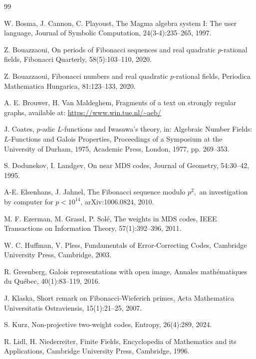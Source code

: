 \documentclass[12pt,reqno]{amsart}
\begin{document}
\begin{thebibliography}{99}


 W. Bosma, J. Cannon, C. Playoust, The Magma algebra system I: The user language, Journal of Symbolic Computation, 24(3-4):235--265, 1997.

 Z. Bouazzaoui, On periods of Fibonacci sequences and real quadratic $p$-rational fields, Fibonacci Quarterly, 58(5):103--110, 2020.

 Z. Bouazzaoui, Fibonacci numbers and real quadratic $p$-rational fields, Periodica Mathematica Hungarica, 81:123--133, 2020.

 A. E. Brouwer, H. Van Maldeghem, Fragments of a text on strongly regular graphs, available at: \url{https://www.win.tue.nl/\~aeb/}

 J. Coates, $p$-adic $L$-functions and Iwasawa's theory, in: Algebraic Number Fields: $L$-Functions and Galois Properties, Proceedings of a Symposium at the University of Durham, 1975, Academic Press, London, 1977, pp. 269--353.

 S. Dodunekov, I. Landgev, On near MDS codes, Journal of Geometry, 54:30--42, 1995.

 A-E. Elsenhans, J. Jahnel, The Fibonacci sequence modulo $p^2,$ an investigation by computer for $p < 10^{14}$, arXiv:1006.0824, 2010.

 M. F. Ezerman, M. Grassl, P. Sol\'e, The weights in MDS codes, IEEE Transactions on Information Theory, 57(1):392--396, 2011.

 W. C. Huffman, V. Pless, Fundamentals of Error-Correcting Codes, Cambridge University Press, Cambridge, 2003.

 R. Greenberg, Galois representations with open image, Annales math\'ematiques du Qu\'ebec, 40(1):83--119, 2016.

 J. Klaska, Short remark on Fibonacci-Wieferich primes, Acta Mathematica Universitatis Ostraviensis, 15(1):21--25, 2007.

 S. Kurz, Non-projective two-weight codes, Entropy, 26(4):289, 2024.

 R. Lidl, H. Niederreiter, Finite Fields, Encyclopedia of Mathematics and its Applications, Cambridge University Press, Cambridge, 1996.


\end{thebibliography}
\end{document}

